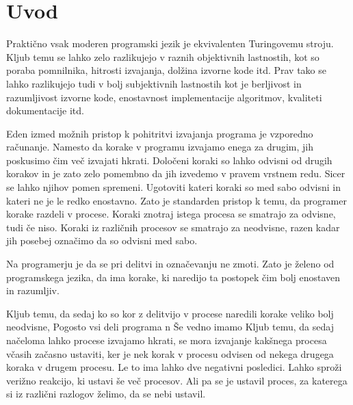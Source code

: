 \section{Uvod} \label{sec:uvod}


Praktično vsak moderen programski jezik je ekvivalenten Turingovemu stroju. Kljub temu se lahko zelo razlikujejo v raznih objektivnih lastnostih, kot so poraba pomnilnika, hitrosti izvajanja, dolžina izvorne kode itd. Prav tako se lahko razlikujejo tudi v bolj subjektivnih lastnostih kot je berljivost in razumljivost izvorne kode, enostavnost implementacije algoritmov, kvaliteti dokumentacije itd.

Eden izmed možnih pristop k pohitritvi izvajanja programa je vzporedno računanje. Namesto da korake v programu izvajamo enega za drugim, jih poskusimo čim več izvajati hkrati. Določeni koraki so lahko odvisni od drugih korakov in je zato zelo pomembno da jih izvedemo v pravem vrstnem redu. Sicer se lahko njihov pomen spremeni. Ugotoviti kateri koraki so med sabo odvisni in kateri ne je le redko enostavno. Zato je standarden pristop k temu, da programer korake razdeli v procese. Koraki znotraj istega procesa se smatrajo za odvisne, tudi če niso. Koraki iz različnih procesov se smatrajo za neodvisne, razen kadar jih posebej označimo da so odvisni med sabo.

Na programerju je da se pri delitvi in označevanju ne zmoti. Zato je želeno od programskega jezika, da ima korake, ki naredijo ta postopek čim bolj
enostaven in razumljiv.

Kljub temu, da sedaj ko so kor z delitvijo v procese naredili korake veliko bolj neodvisne,
Pogosto vsi deli programa n
Še vedno imamo
Kljub temu, da sedaj načeloma lahko procese izvajamo hkrati, se mora izvajanje kakšnega procesa včasih začasno ustaviti, ker je nek korak v procesu odvisen od nekega drugega koraka v drugem procesu. Le to ima lahko dve negativni posledici. Lahko sproži verižno reakcijo, ki ustavi še več procesov. Ali pa se je ustavil proces, za katerega si iz različni razlogov želimo, da se nebi ustavil.

   
 

















